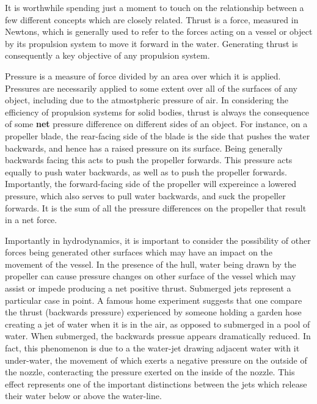 \documentclass{article}\usepackage[]{graphicx}\usepackage[]{color}
\begin{document}
It is worthwhile spending just a moment to touch on the relationship between a few different concepts which are closely related.  Thrust is a force, measured in Newtons, which is generally used to refer to the forces acting on a vessel or object by its propulsion system to move it forward in the water.  Generating thrust is consequently a key objective of any propulsion system.

Pressure is a measure of force divided by an area over which it is applied. Pressures are necessarily applied to some extent over all of the surfaces of any object, including due to the atmostpheric pressure of air.  In considering the efficiency of propulsion systems for solid bodies, thrust is always the consequence of some \textbf{net} pressure difference on different sides of an object.  For instance, on a propeller blade, the rear-facing side of the blade is the side that pushes the water backwards, and hence has a raised pressure on its surface.  Being generally backwards facing this acts to push the propeller forwards.  This pressure acts equally to push water backwards, as well as to push the propeller forwards.  Importantly, the forward-facing side of the propeller will expereince a lowered pressure, which also serves to pull water backwards, and suck the propeller forwards.  It is the sum of all the pressure differences on the propeller that result in a net force.

Importantly in hydrodynamics, it is important to consider the possibility of other forces being generated other surfaces which may have an impact on the movement of the vessel.  In the presence of the hull, water being drawn by the propeller can cause pressure changes on other surface of the vessel which may assist or impede producing a net positive thrust.  Submerged jets represent a particular case in point.  A famous home experiment suggests that one compare the thrust (backwards pressure) experienced by someone holding a garden hose creating a jet of water when it is in the air, as opposed to submerged in a pool of water.  When submerged, the backwards pressue appears dramatically reduced.  In fact, this phenomenon is due to a the water-jet drawing adjacent water with it under-water, the movement of which exerts a negative pressure on the outside of the nozzle, conteracting the pressure exerted on the inside of the nozzle. This effect represents one of the important distinctions between the jets which release their water below or above the water-line.
\end{document}
